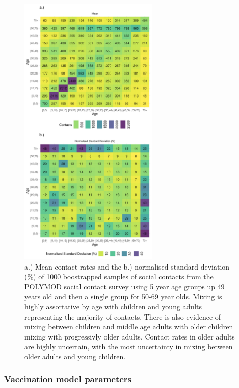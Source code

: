 \documentclass[11pt,twoside]{bristolthesis}
\begin{document}
  \begin{figure}
  
  {\centering \includegraphics[width=250px]{chapters/model-development/resources/figure/contact_matrix} 
  
  }
  
  \caption[a.) Mean contact rates and the b.) normalised standard deviation (\%) of 1000 boostrapped samples of  social contacts from the POLYMOD social contact survey using 5 year age groups up 49 years old and then a single group for 50-69 year olds.]{a.) Mean contact rates and the b.) normalised standard deviation (\%) of 1000 boostrapped samples of  social contacts from the POLYMOD social contact survey using 5 year age groups up 49 years old and then a single group for 50-69 year olds. Mixing is highly assortative by age with children and young adults representing the majority of contacts. There is also evidence of mixing between children and middle age adults with older children mixing with progressivly older adults. Contact rates in older adults are highly uncertain, with the most uncertainty in mixing between older adults and young children.}\label{fig:contact-tile-plot}
  \end{figure}
  \hypertarget{vaccination-model-parameters}{%
  \subsubsection{Vaccination model parameters}\label{vaccination-model-parameters}}
  
\end{document}
